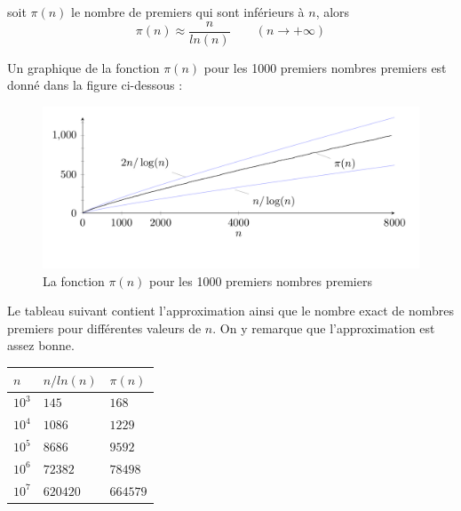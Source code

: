 		\vspace{-1.5em}\begin{adjustwidth}{1.5cm}{1.5cm} 
		\begin{Th}
			soit $\pi(n)$ le nombre de premiers qui sont inférieurs à $n$, alors
			\[\pi(n) \approx \frac{n}{ln(n)} \quad \quad (n \to +\infty)\]
		\end{Th}
		\end{adjustwidth}\vspace{0.5em}
		
	Un graphique de la fonction $\pi(n)$ pour les 1000 premiers nombres premiers est donné dans la figure ci-dessous :
	\begin{figure}[H]
		\begin{center}\includegraphics[scale=0.4]{freqPremiers.png}\end{center}\vspace{-3em}
		\caption{La fonction $\pi(n)$ pour les 1000 premiers nombres premiers}\label{fig:M3}
	\end{figure}
	
	Le tableau suivant contient l'approximation ainsi que le nombre exact de nombres premiers pour différentes valeurs de $n$. On y remarque que l'approximation est assez bonne.
	\begin{table}[H]\begin{center}
		\begin{tabular}{|lll|}
		\hline
		$n$  & $n/ln(n)$ & $\pi(n)$     \\ \hline
		$10^{3}$ & $145$     & $168$     \\
		$10^{4}$ & $1 086$   & $1 229$   \\
		$10^{5}$ & $8 686$   & $9 592$   \\
		$10^{6}$ & $72 382$  & $78 498$  \\
		$10^{7}$ & $620 420$ & $664 579$ \\ \hline
		\end{tabular}
	\end{center}\end{table}
	
